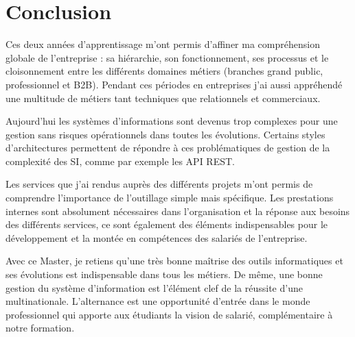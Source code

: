 \section*{Conclusion}

Ces deux années d'apprentissage m'ont permis d'affiner ma compréhension globale de l'entreprise : sa hiérarchie, son fonctionnement, ses processus et le cloisonnement entre les différents domaines métiers (branches grand public, professionnel et B2B).
Pendant ces périodes en entreprises j'ai aussi appréhendé une multitude de métiers tant techniques que relationnels et commerciaux.

Aujourd'hui les systèmes d'informations sont devenus trop complexes pour une gestion sans risques opérationnels dans toutes les évolutions.
Certains styles d'architectures permettent de répondre à ces problématiques de gestion de la complexité des SI, comme par exemple les API REST.

Les services que j'ai rendus auprès des différents projets m'ont permis de comprendre l'importance de l'outillage simple mais spécifique.
Les prestations internes sont absolument nécessaires dans l'organisation et la réponse aux besoins des différents services, ce sont également des éléments indispensables pour le développement et la montée en compétences des salariés de l'entreprise.

Avec ce Master, je retiens qu'une très bonne maîtrise des outils informatiques et ses évolutions est indispensable dans tous les métiers.
De même, une bonne gestion du système d'information est l'élément clef de la réussite d'une multinationale.
L'alternance est une opportunité d'entrée dans le monde professionnel qui apporte aux étudiants la vision de salarié, complémentaire à notre formation.

%





